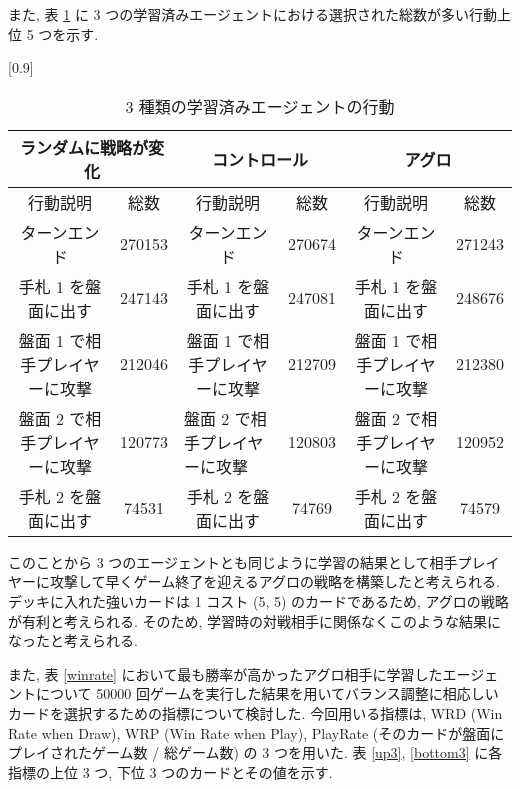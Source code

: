 \documentclass{jarticle}     %
\begin{document}
また, 表 \ref{action} に 3 つの学習済みエージェントにおける選択された総数が多い行動上位 5 つを示す.

\begin{table}[ht]
  \centering
  \caption{3 種類の学習済みエージェントの行動}
  \label{action}
  \scalebox{0.9}[0.9]{
    \begin{tabular}{|cc|cc|cc|}
      \hline
      \multicolumn{2}{|c|}{ランダムに戦略が変化}                & \multicolumn{2}{c|}{コントロール}                    & \multicolumn{2}{c|}{アグロ}                       \\ \hline
      \multicolumn{1}{|c|}{行動説明}             & 総数     & \multicolumn{1}{c|}{行動説明}             & 総数     & \multicolumn{1}{c|}{行動説明}             & 総数     \\ \hline
      \multicolumn{1}{|c|}{ターンエンド}           & 270153 & \multicolumn{1}{c|}{ターンエンド}           & 270674 & \multicolumn{1}{c|}{ターンエンド}           & 271243 \\ \hline
      \multicolumn{1}{|c|}{手札 1 を盤面に出す}      & 247143 & \multicolumn{1}{c|}{手札 1 を盤面に出す}      & 247081 & \multicolumn{1}{c|}{手札 1 を盤面に出す}      & 248676 \\ \hline
      \multicolumn{1}{|c|}{盤面 1 で相手プレイヤーに攻撃} & 212046 & \multicolumn{1}{c|}{盤面 1 で相手プレイヤーに攻撃} & 212709 & \multicolumn{1}{c|}{盤面 1 で相手プレイヤーに攻撃} & 212380 \\ \hline
      \multicolumn{1}{|c|}{盤面 2 で相手プレイヤーに攻撃} & 120773 & \multicolumn{1}{l|}{盤面 2 で相手プレイヤーに攻撃} & 120803 & \multicolumn{1}{c|}{盤面 2 で相手プレイヤーに攻撃} & 120952 \\ \hline
      \multicolumn{1}{|c|}{手札 2 を盤面に出す}      & 74531  & \multicolumn{1}{c|}{手札 2 を盤面に出す}      & 74769  & \multicolumn{1}{c|}{手札 2 を盤面に出す}      & 74579  \\ \hline
      \end{tabular}
  }
  
  \end{table}

  このことから 3 つのエージェントとも同じように学習の結果として相手プレイヤーに攻撃して早くゲーム終了を迎えるアグロの戦略を構築したと考えられる. デッキに入れた強いカードは 1 コスト (5, 5) のカードであるため, アグロの戦略が有利と考えられる. そのため, 学習時の対戦相手に関係なくこのような結果になったと考えられる. 
  
  また, 表 \ref{winrate} において最も勝率が高かったアグロ相手に学習したエージェントについて 50000 回ゲームを実行した結果を用いてバランス調整に相応しいカードを選択するための指標について検討した. 
  今回用いる指標は, WRD (Win Rate when Draw), WRP (Win Rate when Play), PlayRate (そのカードが盤面にプレイされたゲーム数 / 総ゲーム数) の 3 つを用いた. 表 \ref{up3}, \ref{bottom3} に各指標の上位 3 つ, 下位 3 つのカードとその値を示す. 
\end{document}
